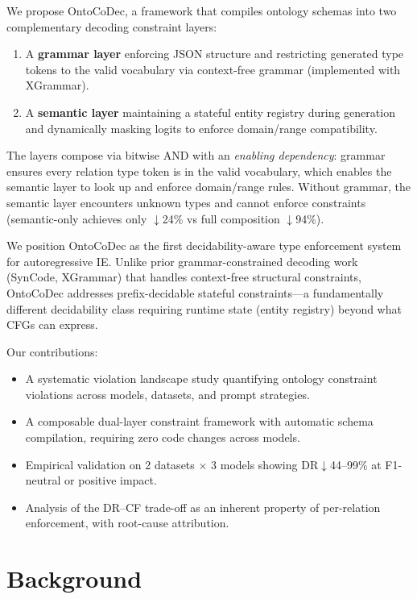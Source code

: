 \documentclass[11pt]{article}
\begin{document}
We propose OntoCoDec, a framework that compiles ontology schemas into two complementary decoding constraint layers:
\begin{enumerate}
\item A \textbf{grammar layer} enforcing JSON structure and restricting generated type tokens to the valid vocabulary via context-free grammar (implemented with XGrammar).
\item A \textbf{semantic layer} maintaining a stateful entity registry during generation and dynamically masking logits to enforce domain/range compatibility.
\end{enumerate}

The layers compose via bitwise AND with an \emph{enabling dependency}: grammar ensures every relation type token is in the valid vocabulary, which enables the semantic layer to look up and enforce domain/range rules. Without grammar, the semantic layer encounters unknown types and cannot enforce constraints (semantic-only achieves only $\downarrow$24\% vs full composition $\downarrow$94\%).

We position OntoCoDec as the first decidability-aware type enforcement system for autoregressive IE. Unlike prior grammar-constrained decoding work (SynCode, XGrammar) that handles context-free structural constraints, OntoCoDec addresses prefix-decidable stateful constraints---a fundamentally different decidability class requiring runtime state (entity registry) beyond what CFGs can express.

Our contributions:
\begin{itemize}
\item A systematic violation landscape study quantifying ontology constraint violations across models, datasets, and prompt strategies.
\item A composable dual-layer constraint framework with automatic schema compilation, requiring zero code changes across models.
\item Empirical validation on 2 datasets $\times$ 3 models showing DR$\downarrow$44--99\% at F1-neutral or positive impact.
\item Analysis of the DR--CF trade-off as an inherent property of per-relation enforcement, with root-cause attribution.
\end{itemize}

\section{Background}
\end{document}
